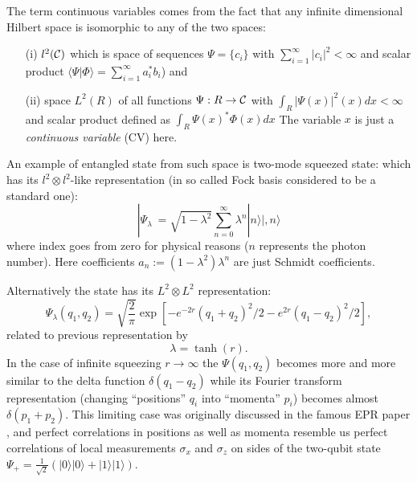 \documentclass[rmp,12pt,preprint]{revtex4-2}
\begin{document}
The term continuous variables comes from the fact that any infinite
dimensional Hilbert space is isomorphic to any of the two spaces:
\begin{itemize}
\item[(i)] $l^{2}({\cal C})$ which is space of sequences $\Psi=\{
  c_{i} \}$ with $\sum_{i=1}^{\infty} |c_{i}|^{2} < \infty $ and
  scalar product $\langle\Psi|\Phi\rangle=\sum_{i=1}^{\infty}
  a_{i}^{*}b_{i}$) and

\item[(ii)] space $L^{2}(R)$ of all functions $\Psi:R \rightarrow
  {\cal C}$ with $\int_{R}|\Psi(x)|^{2}(x)dx < \infty$ and scalar
  product defined as $\int_{R}\Psi(x)^{*} \Phi(x) dx $ The variable
  $x$ is just a {\it continuous variable} (CV) here.
\end{itemize}

An example of entangled state from such space is two-mode squeezed
state: which has its $l^{2}\otimes l^{2}$-like representation (in so
called Fock basis considered to be a standard one):
\begin{equation}
|\Psi_{\lambda}\>=\sqrt{1-\lambda^{2}}\sum_{n=0}^{\infty}\lambda^{n}|n\rangle|,
n \rangle \label{squeezed}
\end{equation}
where index goes from zero for physical reasons ($n$ represents the
photon number). Here coefficients $a_{n}:=(1-\lambda^{2})\lambda^{n}$
are just Schmidt coefficients.

Alternatively the state has its $L^{2}\otimes L^{2}$ representation:
\begin{equation}
\Psi_{\lambda}(q_1,q_2)=\sqrt{\frac{2}{\pi}}\exp[-e^{-2r}(q_1+q_2)^{2}/2
-e^{2r}(q_1-q_2)^{2}/2],
\end{equation}
related to previous representation  by
\begin{equation}
\lambda=\tanh(r).
\end{equation}
In the case of infinite squeezing $r \rightarrow \infty$ the
$\Psi(q_1,q_2)$ becomes more and more similar to the delta function
$\delta(q_{1} - q_{2})$ while its Fourier transform representation
(changing ``positions'' $q_{i}$ into ``momenta'' $p_{i}$) becomes
almost $\delta(p_{1} + p_{2})$. This limiting case was originally
discussed in the famous EPR paper \cite{EPR}, and perfect correlations
in positions as well as momenta resemble us perfect correlations of
local measurements $\sigma_{x}$ and $\sigma_{z}$ on sides of the
two-qubit state $\Psi_{+}=\frac{1}{\sqrt{2}}(|0\rangle|0\rangle +
|1\rangle| 1\rangle)$.
\end{document}
